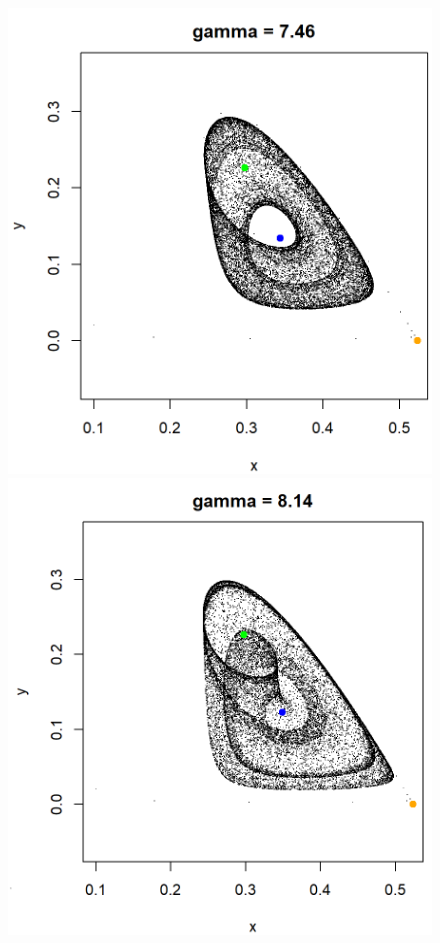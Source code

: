 \documentclass[10pt]{Configuration_Files/PoliMi3i_thesis}
\begin{document}
\begin{figure}[H]
  \includegraphics[width=\linewidth]{images/Chapter 6.1/unnamed-chunk-8-1.png}
\endminipage\hfill
{}
  \includegraphics[width=\linewidth]{images/Chapter 6.1/unnamed-chunk-10-1.png}

\end{figure}
\end{document}
